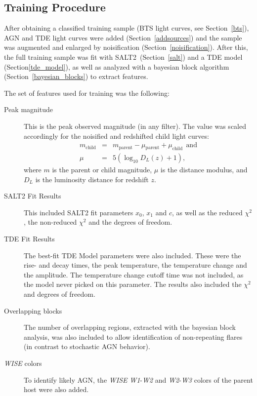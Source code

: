 \subsection{Training Procedure}
After obtaining a classified training sample (BTS light curves, see Section~\ref{bts}), AGN and TDE light curves were added (Section~\ref{addsources}) and the sample was augmented and enlarged by noisification (Section~\ref{noisification}). After this, the full training sample was fit with SALT2~(Section~\ref{salt}) and a TDE model (Section\ref{tde_model}), as well as analyzed with a bayesian block algorithm (Section~\ref{bayesian_blocks}) to extract features.

The set of features used for training was the following:

\begin{description}
    \item[Peak magnitude] This is the peak observed magnitude (in any filter). The value was scaled accordingly for the noisified and redshifted child light curves:
        \begin{subequations}
            \begin{eqnarray}
                m_\text{child} &=& m_\text{parent} - \mu­_\text{parent} + \mu_\text{child}~~\text{and}\\
                \mu &=& 5(\log_{10}D_L(z)+1),
            \end{eqnarray}
        \end{subequations}
        where $m$ is the parent or child magnitude, $\mu$ is the distance modulus, and $D_L$ is the luminosity distance for redshift $z$.
    \item[SALT2 Fit Results] This included SALT2 fit parameters $x_0$, $x_1$ and $c$, as well as the reduced $\chi^2$, the non-reduced $\chi^2$ and the degrees of freedom.
    \item[TDE Fit Results] The best-fit TDE Model parameters were also included. These were the rise- and decay times, the peak temperature, the temperature change and the amplitude. The temperature change cutoff time was not included, as the model never picked on this parameter. The results also included the $\chi^2$ and degrees of freedom.
    \item[Overlapping blocks] The number of overlapping regions, extracted with the bayesian block analysis, was also included to allow identification of non-repeating flares (in contrast to stochastic AGN behavior).
    \item[\textit{WISE} colors] To identify likely AGN, the \textit{WISE} \textit{W1}-\textit{W2} and \textit{W2}-\textit{W3} colors of the parent host were also added.

\end{description}
